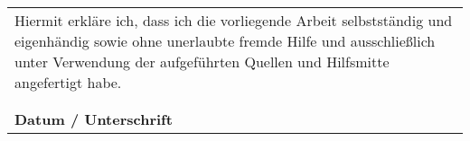 \documentclass[11pt,a4paper,twoside]{book}
\begin{document}
\pagestyle{plain}




\clearpage
{\pagestyle{empty}\cleardoublepage}%



\begin{minipage}[b][12cm]{\textwidth}
	\begin{center}
		\begin{tabular}{m{12cm}}
			\large{Hiermit erkläre ich, dass ich die vorliegende Arbeit selbstständig und eigenhändig sowie ohne unerlaubte fremde Hilfe und ausschließlich unter Verwendung der aufgeführten Quellen und Hilfsmitte angefertigt habe. }				\\
											\\
											\\
			\midrule
			\textbf{Datum / Unterschrift}	\\
		\end{tabular}
	\end{center}
\end{minipage}

\cleardoublepage




\cleardoublepage




\setlength{\parskip}{3mm}
\setcounter{tocdepth}{5}
\tableofcontents
\cleardoublepage


\listoffigures
\vspace{1cm}

\begingroup
\let\clearpage\relax
\listoftables
\endgroup


\cleardoublepage



\pagestyle{headings}
\fancyhf{} 
\pagestyle{fancy} 
\fancyhead[RO]{\sc\nouppercase\rightmark} 
\fancyhead[LE]{\sc\nouppercase\leftmark}
\cfoot{\thepage}
\renewcommand{\headheight}{14pt}






\end{document}
